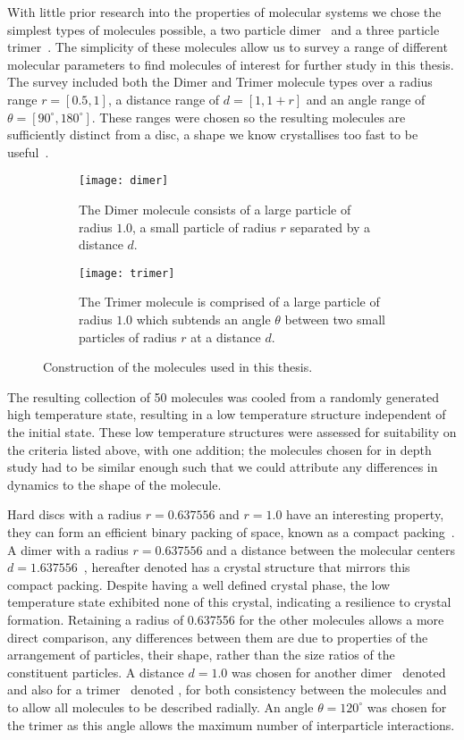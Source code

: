 With little prior research into the properties of molecular systems we chose the simplest types of molecules possible, a two particle dimer~ and a three particle trimer~. The simplicity of these molecules allow us to survey a range of different molecular parameters to find molecules of interest for further study in this thesis. The survey included both the Dimer and Trimer molecule types over a radius range $r = [0.5,1]$, a distance range of $d = [1,1+r]$ and an angle range of $\theta = [90^\circ,180^\circ]$. These ranges were chosen so the resulting molecules are sufficiently distinct from a disc, a shape we know crystallises too fast to be useful~\cite{verlet:67}.

\begin{figure}
    \centering
    \begin{subfigure}[t]{0.48\textwidth}
        \texttt{[image: dimer]}
        \caption{The Dimer molecule consists of a large particle of radius $1.0$, a small particle of radius $r$ separated by a distance $d$.}
        \label{fig:dimer}
    \end{subfigure}\hfill
    \begin{subfigure}[t]{0.48\textwidth}
        \texttt{[image: trimer]}
        \caption{The Trimer molecule is comprised of a large particle of radius $1.0$ which subtends an angle $\theta$ between two small particles of radius $r$ at a distance $d$.}
        \label{fig:trimer}
    \end{subfigure}
    \caption{Construction of the molecules used in this thesis.}
    \label{fig:construction}
\end{figure}

The resulting collection of 50 molecules was cooled from a randomly generated high temperature state, resulting in a low temperature structure independent of the initial state. These low temperature structures were assessed for suitability on the criteria listed above, with one addition; the molecules chosen for in depth study had to be similar enough such that we could attribute any differences in dynamics to the shape of the molecule.

Hard discs with a radius $r=0.637556$ and $r=1.0$ have an interesting property, they can form an efficient binary packing of space, known as a compact packing~\appref{}. A dimer with a radius $r= 0.637556$ and a distance between the molecular centers $d= 1.637556$~, hereafter denoted \dcon has a crystal structure that mirrors this compact packing. Despite \dcon having a well defined crystal phase, the low temperature state exhibited none of this crystal, indicating a resilience to crystal formation. Retaining a radius of 0.637556 for the other molecules allows a more direct comparison, any differences between them are due to properties of the arrangement of particles, their shape, rather than the size ratios of the constituent particles. A distance $d= 1.0$ was chosen for another dimer~ denoted \done and also for a trimer~ denoted \tri, for both consistency between the molecules and to allow all molecules to be described radially. An angle $\theta=120^\circ$ was chosen for the trimer as this angle allows the maximum number of interparticle interactions.


